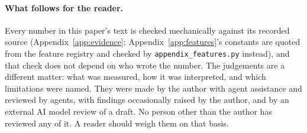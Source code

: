 \paragraph{What follows for the reader.} Every number in this paper's text is checked mechanically
against its recorded source (Appendix~\ref{app:evidence}; Appendix~\ref{app:features}'s constants
are quoted from the feature registry and checked by \texttt{appendix\_features.py} instead), and that check does not depend on who wrote the
number. The judgements are a different matter: what was measured, how it was interpreted, and which
limitations were named. They were made by the author with agent assistance and reviewed by agents,
with findings occasionally raised by the author, and by an external AI model review of a draft. No
person other than the author has reviewed any of it. A reader should weigh them on that basis.
